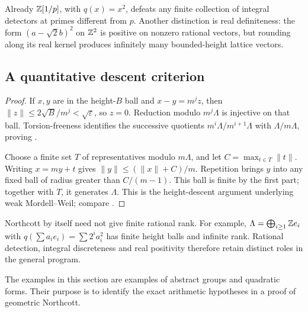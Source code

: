 Already \(\mathbb Z[1/p]\), with \(q(x)=x^2\), defeats any finite
collection of integral detectors at primes different from \(p\).
Another distinction is real definiteness: the form
\((a-\sqrt2b)^2\) on \(\mathbb Z^2\) is positive on nonzero rational
vectors, but rounding along its real kernel produces infinitely
many bounded-height lattice vectors.

\subsection{A quantitative descent criterion}\label{sec:weak-mw}


\begin{proof}
If \(x,y\) are in the height-\(B\) ball and
\(x-y=m^jz\), then
\(\|z\|\le2\sqrt B/m^j<\sqrt\varepsilon\), so \(z=0\).
Reduction modulo \(m^j\Lambda\) is injective on that ball.
Torsion-freeness identifies the successive quotients
\(m^i\Lambda/m^{i+1}\Lambda\) with \(\Lambda/m\Lambda\),
proving .

Choose a finite set \(T\) of representatives modulo
\(m\Lambda\), and let \(C=\max_{t\in T}\|t\|\).
Writing \(x=my+t\) gives
\(\|y\|\le(\|x\|+C)/m\). Repetition brings \(y\) into
any fixed ball of radius greater than \(C/(m-1)\). This ball
is finite by the first part; together with \(T\), it generates
\(\Lambda\). This is the height-descent argument underlying
weak Mordell--Weil; compare \cite[Section~10.3]{ConradFeng}.
\end{proof}

Northcott by itself need not give finite rational rank. For example,
\(\Lambda=\bigoplus_{i\ge1}\mathbb Z e_i\) with
\(q(\sum a_ie_i)=\sum2^ia_i^2\) has finite height balls and
infinite rank. Rational detection, integral discreteness and real
positivity therefore retain distinct roles in the general program.

The examples in this section are examples of abstract groups and
quadratic forms. Their purpose is to identify the exact arithmetic
hypotheses in a proof of geometric Northcott.
